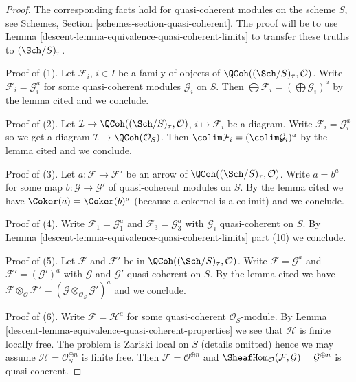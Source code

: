 \begin{proof}

The corresponding facts hold for quasi-coherent modules on the scheme $S$,
see Schemes, Section \ref{schemes-section-quasi-coherent}. The proof will
be to use Lemma \ref{descent-lemma-equivalence-quasi-coherent-limits} to transfer
these truths to $(\Sch/S)_\tau$.

\medskip\noindent
Proof of (1). Let $\mathcal{F}_i$, $i \in I$ be a family of objects of
$\QCoh((\Sch/S)_\tau, \mathcal{O})$. Write $\mathcal{F}_i = \mathcal{G}_i^a$
for some quasi-coherent modules $\mathcal{G}_i$ on $S$.
Then $\bigoplus \mathcal{F}_i = (\bigoplus \mathcal{G}_i)^a$ by
the lemma cited and we conclude.

\medskip\noindent
Proof of (2). Let $\mathcal{I} \to \QCoh((\Sch/S)_\tau, \mathcal{O})$,
$i \mapsto \mathcal{F}_i$ be a diagram. Write
$\mathcal{F}_i = \mathcal{G}_i^a$ so we get a diagram
$\mathcal{I} \to \QCoh(\mathcal{O}_S)$.
Then $\colim \mathcal{F}_i = (\colim \mathcal{G}_i)^a$ by
the lemma cited and we conclude.

\medskip\noindent
Proof of (3). Let $a : \mathcal{F} \to \mathcal{F}'$
be an arrow of $\QCoh((\Sch/S)_\tau, \mathcal{O})$.
Write $a = b^a$ for some map $b : \mathcal{G} \to \mathcal{G}'$
of quasi-coherent modules on $S$. By the lemma cited
we have $\Coker(a) = \Coker(b)^a$ (because a cokernel is a colimit)
and we conclude.

\medskip\noindent
Proof of (4). Write $\mathcal{F}_1 = \mathcal{G}_1^a$
and $\mathcal{F}_3 = \mathcal{G}_3^a$ with
$\mathcal{G}_i$ quasi-coherent on $S$.
By Lemma \ref{descent-lemma-equivalence-quasi-coherent-limits} part (10)
we conclude.

\medskip\noindent
Proof of (5). Let $\mathcal{F}$ and $\mathcal{F}'$ be in
$\QCoh((\Sch/S)_\tau, \mathcal{O})$. Write $\mathcal{F} = \mathcal{G}^a$
and $\mathcal{F}' = (\mathcal{G}')^a$
with $\mathcal{G}$ and $\mathcal{G}'$ quasi-coherent on $S$.
By the lemma cited we have
$\mathcal{F} \otimes_\mathcal{O} \mathcal{F}' =
(\mathcal{G} \otimes_{\mathcal{O}_S} \mathcal{G}')^a$
and we conclude.

\medskip\noindent
Proof of (6). Write $\mathcal{F} = \mathcal{H}^a$ for some
quasi-coherent $\mathcal{O}_S$-module. By
Lemma \ref{descent-lemma-equivalence-quasi-coherent-properties}
we see that $\mathcal{H}$ is finite locally free.
The problem is Zariski local on $S$ (details omitted) hence
we may assume $\mathcal{H} = \mathcal{O}_S^{\oplus n}$ is
finite free. Then $\mathcal{F} = \mathcal{O}^{\oplus n}$
and $\SheafHom_\mathcal{O}(\mathcal{F}, \mathcal{G}) = \mathcal{G}^{\oplus n}$
is quasi-coherent.
\end{proof}

